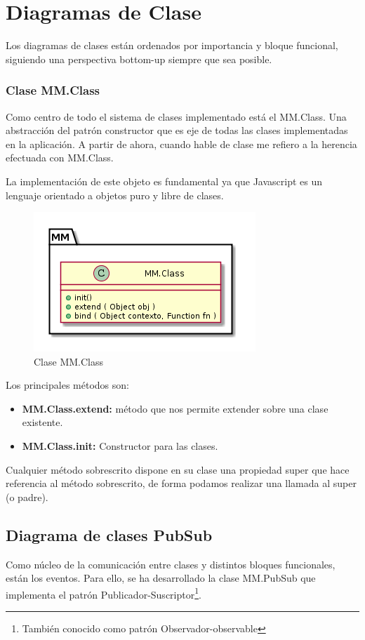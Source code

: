\section{Diagramas de Clase}

Los diagramas de clases están ordenados por importancia y bloque funcional, siguiendo una
perspectiva bottom-up siempre que sea posible.


\subsubsection{Clase MM.Class}
Como centro de todo el sistema de clases implementado está el MM.Class. Una abstracción del 
patrón constructor que es eje de todas las clases implementadas en la aplicación. A partir 
de ahora, cuando hable de clase me refiero a la herencia efectuada con MM.Class.

La implementación de este objeto es fundamental ya que Javascript es un lenguaje orientado 
a objetos puro y libre de clases. 

\begin{figure}[tbph]
\centering
\includegraphics[width=0.4\linewidth]{imagenes/diagrama-clase-mm-class}
\caption{Clase MM.Class}
\label{fig:diagrama-clase-mm-class}
\end{figure}
Los principales métodos son:
\begin{itemize}
\item \textbf{MM.Class.extend:} método que nos permite extender sobre una clase existente.
\item \textbf{MM.Class.init:} Constructor para las clases.
\end{itemize}

Cualquier método sobrescrito dispone en su clase una propiedad \underline{ }super que hace referencia al método sobrescrito, de forma
podamos realizar una llamada al super (o padre).


\subsection{Diagrama de clases PubSub}

Como núcleo de la comunicación entre clases y distintos bloques funcionales, están los eventos. Para ello, se ha desarrollado
la clase MM.PubSub que implementa el patrón Publicador-Suscriptor\footnote{También conocido como patrón Observador-observable}.

